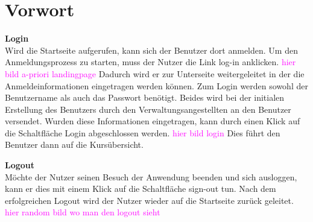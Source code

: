 
\chapter{Vorwort}
\label{sec:chapAllgemein} 
\textbf{Login}\\
Wird die Startseite aufgerufen, kann sich der Benutzer dort anmelden. Um den Anmeldungsprozess zu starten, muss der Nutzer die Link \glqq log-in\grqq\: anklicken. 
\textcolor{magenta}{hier bild a-priori landingpage}
Dadurch wird er zur Unterseite weitergeleitet in der die Anmeldeinformationen eingetragen werden können. Zum Login werden sowohl der Benutzername als auch das Passwort benötigt. Beides wird bei der initialen Erstellung des Benutzers durch den Verwaltungsangestellten an den Benutzer versendet. Wurden diese Informationen eingetragen, kann durch einen Klick auf die Schaltfläche \glqq Login\grqq\: abgeschlossen werden.
\textcolor{magenta}{hier bild login}
Dies führt den Benutzer dann auf die Kursübersicht.

\textbf{Logout}\\
Möchte der Nutzer seinen Besuch der Anwendung beenden und sich ausloggen, kann er dies mit einem Klick auf die Schaltfläche \glqq sign-out\grqq\: tun. Nach dem erfolgreichen Logout wird der Nutzer wieder auf die Startseite zurück geleitet.
\textcolor{magenta}{hier random bild wo man den logout sieht}
